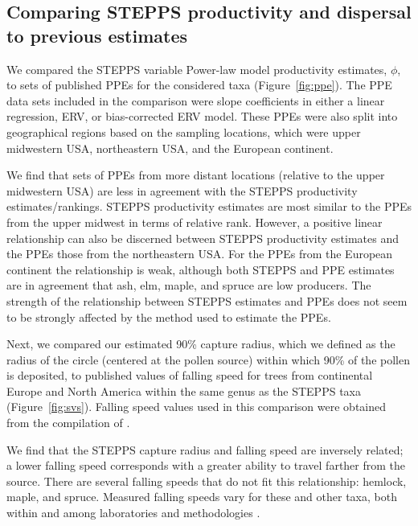 \documentclass[12pt]{article}
\begin{document}
\subsection{Comparing STEPPS productivity and dispersal to previous
  estimates}

We compared the STEPPS variable Power-law model productivity
estimates, $\phi$, to sets of published PPEs for the considered taxa
(Figure~\ref{fig:ppe}). The PPE data sets included in the comparison
were slope coefficients in either a linear regression, ERV, or
bias-corrected ERV model. These PPEs were also split into geographical
regions based on the sampling locations, which were upper midwestern
USA, northeastern USA, and the European
continent. %

We find that sets of PPEs from more distant locations (relative to the
upper midwestern USA) are less in agreement with the STEPPS
productivity estimates/rankings.  STEPPS productivity estimates are
most similar to the PPEs from the upper midwest in terms of relative
rank. However, a positive linear relationship can also be discerned
between STEPPS productivity estimates and the PPEs those from the
northeastern USA. For the PPEs from the European continent the
relationship is weak, although both STEPPS and PPE estimates are in
agreement that ash, elm, maple, and spruce are low producers. The
strength of the relationship between STEPPS estimates and PPEs does
not seem to be strongly affected by the method used to estimate the
PPEs.

Next, we compared our estimated 90\% capture radius, which we defined
as the radius of the circle (centered at the pollen source) within
which 90\% of the pollen is deposited, to published values of
falling speed for trees from continental Europe and North
America within the same genus as the STEPPS taxa
(Figure~\ref{fig:svs}). Falling speed values used in this
comparison were obtained from the compilation of
\citet{jackson1999pollen}.


We find that the STEPPS capture radius and falling speed are inversely
related; a lower falling speed corresponds with a greater ability to
travel farther from the source. There are several falling speeds that
do not fit this relationship: hemlock, maple, and spruce. Measured
falling speeds vary for these and other taxa, both within and among
laboratories and methodologies \citep{jackson1999pollen}.
\end{document}

